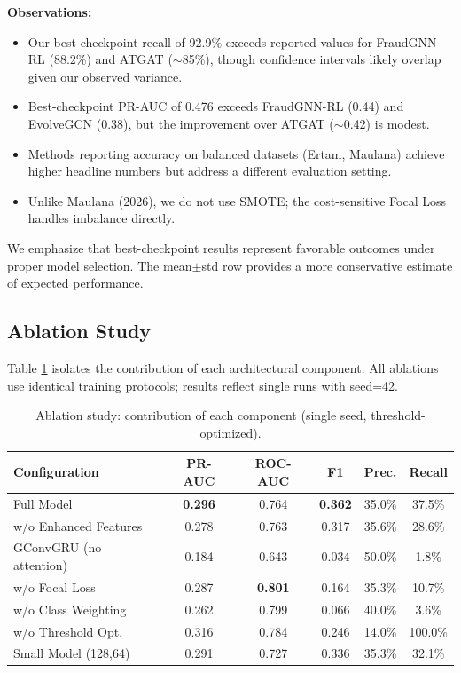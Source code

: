 \documentclass[12pt,a4paper]{article}
\begin{document}
\textbf{Observations:}
\begin{itemize}
    \item Our best-checkpoint recall of 92.9\% exceeds reported values for FraudGNN-RL (88.2\%) and ATGAT ($\sim$85\%), though confidence intervals likely overlap given our observed variance.
    \item Best-checkpoint PR-AUC of 0.476 exceeds FraudGNN-RL (0.44) and EvolveGCN (0.38), but the improvement over ATGAT ($\sim$0.42) is modest.
    \item Methods reporting accuracy on balanced datasets (Ertam, Maulana) achieve higher headline numbers but address a different evaluation setting.
    \item Unlike Maulana (2026), we do not use SMOTE; the cost-sensitive Focal Loss handles imbalance directly.
\end{itemize}

We emphasize that best-checkpoint results represent favorable outcomes under proper model selection. The mean$\pm$std row provides a more conservative estimate of expected performance.

\subsection{Ablation Study}
Table \ref{tab:ablation} isolates the contribution of each architectural component. All ablations use identical training protocols; results reflect single runs with seed=42.

\begin{table}[H]
\centering
\caption{Ablation study: contribution of each component (single seed, threshold-optimized).}
\label{tab:ablation}
\begin{tabular}{lccccc}
\toprule
\textbf{Configuration} & \textbf{PR-AUC} & \textbf{ROC-AUC} & \textbf{F1} & \textbf{Prec.} & \textbf{Recall} \\
\midrule
Full Model & \textbf{0.296} & 0.764 & \textbf{0.362} & 35.0\% & 37.5\% \\
w/o Enhanced Features & 0.278 & 0.763 & 0.317 & 35.6\% & 28.6\% \\
GConvGRU (no attention) & 0.184 & 0.643 & 0.034 & 50.0\% & 1.8\% \\
w/o Focal Loss & 0.287 & \textbf{0.801} & 0.164 & 35.3\% & 10.7\% \\
w/o Class Weighting & 0.262 & 0.799 & 0.066 & 40.0\% & 3.6\% \\
w/o Threshold Opt. & 0.316 & 0.784 & 0.246 & 14.0\% & 100.0\% \\
Small Model (128,64) & 0.291 & 0.727 & 0.336 & 35.3\% & 32.1\% \\
\bottomrule
\end{tabular}
\end{table}
\end{document}
